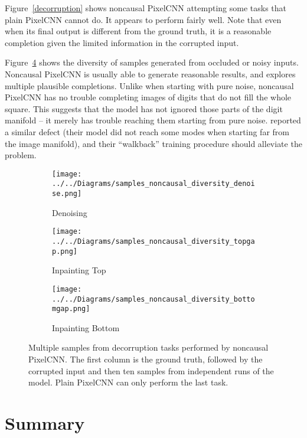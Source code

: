\documentclass[11pt, a4paper, openany]{book}
\newcommand{\nquote}[1]{``{#1}''}
\begin{document}
Figure~\ref{decorruption} shows noncausal PixelCNN attempting some tasks that plain PixelCNN cannot do. It appears to perform fairly well. Note that even when its final output is different from the ground truth, it is a reasonable completion given the limited information in the corrupted input.

Figure~\ref{diversity} shows the diversity of samples generated from occluded or noisy inputs. Noncausal PixelCNN is usually able to generate reasonable results, and explores multiple plausible completions. Unlike when starting with pure noise, noncausal PixelCNN has no trouble completing images of digits that do not fill the whole square. This suggests that the model has not ignored those parts of the digit manifold -- it merely has trouble reaching them starting from pure noise. \citet{denoisinggenerative} reported a similar defect (their model did not reach some modes when starting far from the image manifold), and their \nquote{walkback} training procedure should alleviate the problem.

\begin{figure}
  \centering    
    \begin{subfigure}{0.32\columnwidth}
        \centering
        \caption{Denoising}
        \texttt{[image: ../../Diagrams/samples\_noncausal\_diversity\_denoise.png]} 
        \label{diversity:denoise}
    \end{subfigure}
    \hfill
    \begin{subfigure}{0.32\columnwidth}
        \centering
        \caption{Inpainting Top}
        \texttt{[image: ../../Diagrams/samples\_noncausal\_diversity\_topgap.png]} 
        \label{diversity:topgap}
    \end{subfigure}
    \hfill
    \begin{subfigure}{0.32\columnwidth}
        \centering
        \caption{Inpainting Bottom}
        \texttt{[image: ../../Diagrams/samples\_noncausal\_diversity\_bottomgap.png]} 
        \label{diversity:bottomgap}
    \end{subfigure}
  \caption[Diversity of decorruption samples]{Multiple samples from decorruption tasks performed by noncausal PixelCNN. The first column is the ground truth, followed by the corrupted input and then ten samples from independent runs of the model. Plain PixelCNN can only perform the last task.}
  \label{diversity}
\end{figure}

\section{Summary}
\end{document}
